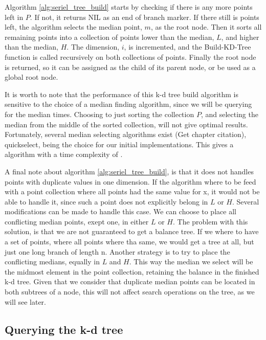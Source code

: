 Algorithm \ref{alg:seriel_tree_build} starts by checking if there is any more points left in $P$. If not, it returns NIL as an end of branch marker. If there still is points left, the algorithm selects the median point, $m$, as the root node. Then it sorts all remaining points into a collection of points lower than the median, $L$, and higher than the median, $H$. The dimension, $i$, is incremented, and the Build-KD-Tree function is called recursively on both collections of points. Finally the root node is returned, so it can be assigned as the child of its parent node, or be used as a global root node.

It is worth to note that the performance of this k-d tree build algorithm is sensitive to the choice of a median finding algorithm, since we will be querying for the median  times. Choosing to just sorting the collection $P$, and selecting the median from the middle of the sorted collection, will not give optimal results. Fortunately, several  median selecting algorithms exist \cite{Cormen:2001} (Get chapter citation), quickselect, being the choice for our initial implementations. This gives a algorithm with a time complexity of  \cite{Friedman:1977}.

A final note about algorithm \ref{alg:seriel_tree_build}, is that it does not handles points with duplicate values in one dimension. If the algorithm where to be feed with a point collection where all points had the same value for x, it would not be able to handle it, since such a point does not explicitly belong in $L$ or $H$. Several modifications can be made to handle this case. We can choose to place all conflicting median points, exept one, in either $L$ or $H$. The problem with this solution, is that we are not guaranteed to get a balance tree. If we where to have a set of points, where all points where tha same, we would get a tree at all, but just one long branch of length n. Another strategy is to try to place the conflicting medians, equally in $L$ and $H$. This way the median we select will be the midmost element in the point collection, retaining the balance in the finished k-d tree. Given that we consider that duplicate median points can be located in both subtrees of a node, this will not affect search operations on the tree, as we will see later.


\subsection{Querying the k-d tree} %
\label{sub:querying_the_k_d_tree}


